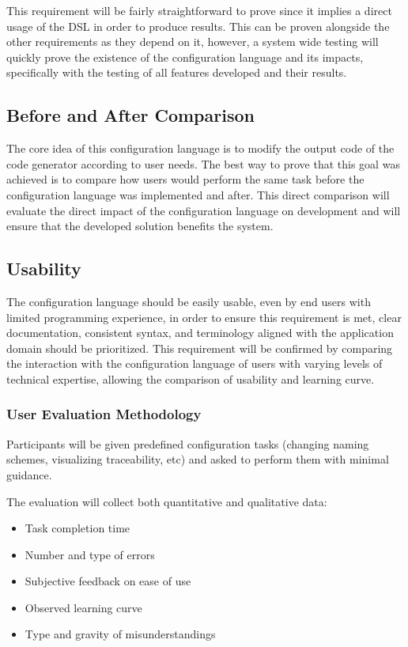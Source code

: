 This requirement will be fairly straightforward to prove since it implies a direct usage of the \gls{DSL} in order to produce results. This can be proven alongside the other requirements as they depend on it, however, a system wide testing will quickly prove the existence of the configuration language and its impacts, specifically with the testing of all features developed and their results.

\subsection*{Before and After Comparison}

The core idea of this configuration language is to modify the output code of the code generator according to user needs. The best way to prove that this goal was achieved is to compare how users would perform the same task before the configuration language was implemented and after. This direct comparison will evaluate the direct impact of the configuration language on development and will ensure that the developed solution benefits the system. 

\subsection*{Usability}

The configuration language should be easily usable, even by end users with limited programming experience, in order to ensure this requirement is met, clear documentation, consistent syntax, and terminology aligned with the application domain should be prioritized. This requirement will be confirmed by comparing the interaction with the configuration language of users with varying levels of technical expertise, allowing the comparison of usability and learning curve.

\subsubsection*{User Evaluation Methodology}

Participants will be given predefined configuration tasks (changing naming schemes, visualizing traceability, etc) and asked to perform them with minimal guidance.

The evaluation will collect both quantitative and qualitative data:
\begin{itemize}
	\item Task completion time
	\item Number and type of errors
	\item Subjective feedback on ease of use
	\item Observed learning curve
	\item Type and gravity of misunderstandings
\end{itemize}


